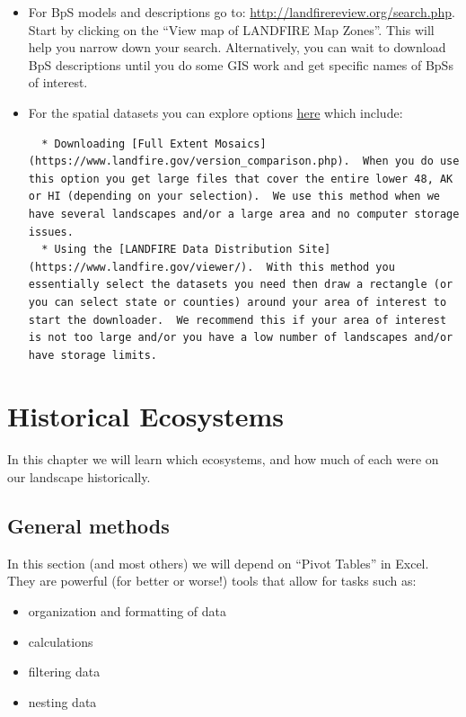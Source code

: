 \documentclass[
]{book}
\providecommand{\tightlist}{%
  \setlength{\itemsep}{0pt}\setlength{\parskip}{0pt}}
\begin{document}
\begin{itemize}
\item
  For BpS models and descriptions go to: \url{http://landfirereview.org/search.php}. Start by clicking on the ``View map of LANDFIRE Map Zones''. This will help you narrow down your search. Alternatively, you can wait to download BpS descriptions until you do some GIS work and get specific names of BpSs of interest.
\item
  For the spatial datasets you can explore options \href{https://www.landfire.gov/getdata.php}{here} which include:

\begin{verbatim}
  * Downloading [Full Extent Mosaics](https://www.landfire.gov/version_comparison.php).  When you do use this option you get large files that cover the entire lower 48, AK or HI (depending on your selection).  We use this method when we have several landscapes and/or a large area and no computer storage issues.
  * Using the [LANDFIRE Data Distribution Site](https://www.landfire.gov/viewer/).  With this method you essentially select the datasets you need then draw a rectangle (or you can select state or counties) around your area of interest to start the downloader.  We recommend this if your area of interest is not too large and/or you have a low number of landscapes and/or have storage limits.
\end{verbatim}
\end{itemize}

\hypertarget{historicalEcosystems}{%
\chapter{Historical Ecosystems}\label{historicalEcosystems}}

In this chapter we will learn which ecosystems, and how much of each were on our landscape historically.

\hypertarget{general-methods}{%
\section{General methods}\label{general-methods}}

In this section (and most others) we will depend on ``Pivot Tables'' in Excel. They are powerful (for better or worse!) tools that allow for tasks such as:

\begin{itemize}
\tightlist
\item
  organization and formatting of data
\item
  calculations
\item
  filtering data
\item
  nesting data
\end{itemize}
\end{document}
